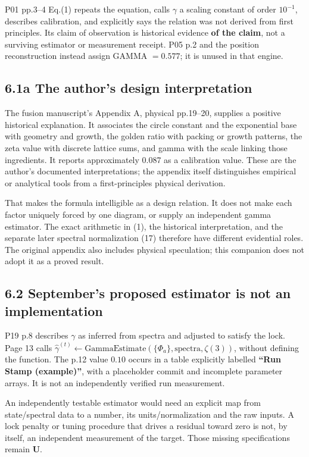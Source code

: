 \documentclass[11pt,a4paper]{article}
\begin{document}
P01 pp.3--4 Eq.(1) repeats the equation, calls $\gamma$ a scaling constant of order $10^{-1}$, describes calibration, and explicitly says the relation was not derived from first principles. Its claim of observation is historical evidence \textbf{of the claim}, not a surviving estimator or measurement receipt. P05 p.2 and the position reconstruction instead assign GAMMA $=0.577$; it is unused in that engine.



\subsection*{6.1a The author's design interpretation}

The fusion manuscript's Appendix A, physical pp.19--20, supplies a positive historical explanation. It associates the circle constant and the exponential base with geometry and growth, the golden ratio with packing or growth patterns, the zeta value with discrete lattice sums, and gamma with the scale linking those ingredients. It reports approximately 0.087 as a calibration value. These are the author's documented interpretations; the appendix itself distinguishes empirical or analytical tools from a first-principles physical derivation.


That makes the formula intelligible as a design relation. It does not make each factor uniquely forced by one diagram, or supply an independent gamma estimator. The exact arithmetic in (1), the historical interpretation, and the separate later spectral normalization (17) therefore have different evidential roles. The original appendix also includes physical speculation; this companion does not adopt it as a proved result.


\subsection*{6.2 September's proposed estimator is not an implementation}

P19 p.8 describes $\gamma$ as inferred from spectra and adjusted to satisfy the lock. Page 13 calls
$\widehat\gamma^{(t)}\leftarrow\mathrm{GammaEstimate}(\{\Phi_a\},\mathrm{spectra},\zeta(3))$,
without defining the function. The p.12 value $0.10$ occurs in a table explicitly labelled \textbf{``Run Stamp (example)''}, with a placeholder commit and incomplete parameter arrays. It is not an independently verified run measurement.


An independently testable estimator would need an explicit map from state/spectral data to a number, its units/normalization and the raw inputs. A lock penalty or tuning procedure that drives a residual toward zero is not, by itself, an independent measurement of the target. Those missing specifications remain \textbf{U}.
\end{document}
